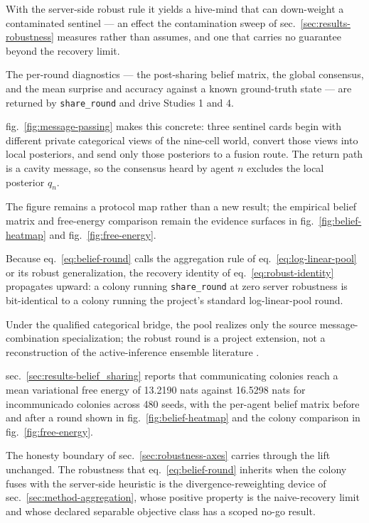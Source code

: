 \documentclass[
  english,
]{article}
\theoremstyle{plain}
\theoremstyle{definition}
\theoremstyle{remark}
\theoremstyle{definition}
\begin{document}
With the server-side robust rule it yields a hive-mind that can
down-weight a contaminated sentinel --- an effect the contamination
sweep of sec.~\ref{sec:results-robustness} measures rather than assumes,
and one that carries no guarantee beyond the recovery limit.

The per-round diagnostics --- the post-sharing belief matrix, the global
consensus, and the mean surprise and accuracy against a known
ground-truth state --- are returned by \texttt{share\_round} and drive
Studies 1 and 4.

fig.~\ref{fig:message-passing} makes this concrete: three sentinel cards
begin with different private categorical views of the nine-cell world,
convert those views into local posteriors, and send only those
posteriors to a fusion route. The return path is a cavity message, so
the consensus heard by agent \(n\) excludes the local posterior \(q_n\).

The figure remains a protocol map rather than a new result; the
empirical belief matrix and free-energy comparison remain the evidence
surfaces in fig.~\ref{fig:belief-heatmap} and
fig.~\ref{fig:free-energy}.

Because eq.~\ref{eq:belief-round} calls the aggregation rule of
eq.~\ref{eq:log-linear-pool} or its robust generalization, the recovery
identity of eq.~\ref{eq:robust-identity} propagates upward: a colony
running \texttt{share\_round} at zero server robustness is bit-identical
to a colony running the project's standard log-linear-pool round.

Under the qualified categorical bridge, the pool realizes only the
source message-combination specialization; the robust round is a project
extension, not a reconstruction of the active-inference ensemble
literature \citep{friston2024federated, heins2023collective}.

sec.~\ref{sec:results-belief_sharing} reports that communicating
colonies reach a mean variational free energy of 13.2190 nats against
16.5298 nats for incommunicado colonies across 480 seeds, with the
per-agent belief matrix before and after a round shown in
fig.~\ref{fig:belief-heatmap} and the colony comparison in
fig.~\ref{fig:free-energy}.

The honesty boundary of sec.~\ref{sec:robustness-axes} carries through
the lift unchanged. The robustness that eq.~\ref{eq:belief-round}
inherits when the colony fuses with the server-side heuristic is the
divergence-reweighting device of sec.~\ref{sec:method-aggregation},
whose positive property is the naive-recovery limit and whose declared
separable objective class has a scoped no-go result.
\end{document}
